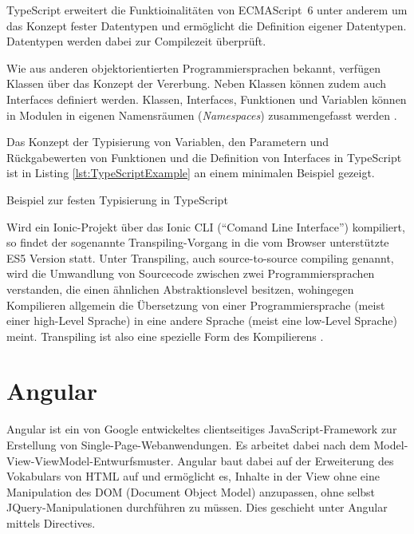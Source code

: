 TypeScript erweitert die Funktioinalitäten von ECMAScript~6 unter anderem um das Konzept fester Datentypen und ermöglicht die Definition eigener Datentypen. Datentypen werden dabei zur Compilezeit überprüft.

Wie aus anderen objektorientierten Programmiersprachen bekannt, verfügen Klassen über das Konzept der Vererbung. Neben Klassen können zudem auch Interfaces definiert werden. Klassen, Interfaces, Funktionen und Variablen können in Modulen in eigenen Namensräumen (\emph{Namespaces}) zusammengefasst werden \cite{MicrosoftTypeScriptDoku}.

Das Konzept der Typisierung von Variablen, den Parametern und Rückgabewerten von Funktionen und die Definition von Interfaces in TypeScript ist in Listing \ref{lst:TypeScriptExample} an einem minimalen Beispiel gezeigt.

\begin{listing}[htb]
    
    \caption{Beispiel zur festen Typisierung in TypeScript}
    \label{lst:TypeScriptExample}
\end{listing}

Wird ein Ionic-Projekt über das Ionic CLI (\enquote{Comand Line Interface}) kompiliert, so findet der sogenannte Transpiling-Vorgang in die vom Browser unterstützte ES5 Version statt. Unter Transpiling, auch source-to-source compiling genannt, wird die Umwandlung von Sourcecode zwischen zwei Programmiersprachen verstanden, die einen ähnlichen Abstraktionslevel besitzen, wohingegen Kompilieren allgemein die Übersetzung von einer Programmiersprache (meist einer high-Level Sprache) in eine andere Sprache (meist eine low-Level Sprache) meint. Transpiling ist also eine spezielle Form des Kompilierens \cite{TranspilingVsCompiling}.
%
%
\section{Angular}
\label{sec:Angular}
%
Angular ist ein von Google entwickeltes clientseitiges JavaScript-Framework zur Erstellung von Single-Page-Webanwendungen. Es arbeitet dabei nach dem Model-View-ViewModel-Entwurfsmuster. Angular baut dabei auf der Erweiterung des Vokabulars von HTML auf und ermöglicht es, Inhalte in der View ohne eine Manipulation des DOM (Document Object Model) anzupassen, ohne selbst JQuery-Manipulationen durchführen zu müssen. Dies geschieht unter Angular mittels Directives.

